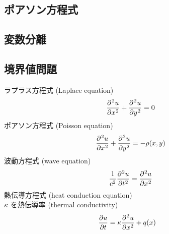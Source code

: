 \documentclass[uplatex,diffipdfmx,a4paper,11pt]{jlreq}
\begin{document}
\subsection{ポアソン方程式}

\subsection{変数分離}

\subsection{境界値問題}
\begin{definition}
  ラプラス方程式 (Laplace equation)
  \begin{align}
    \diffp[2]{u}{x} + \diffp[2]{u}{y} = 0
  \end{align}
  ポアソン方程式 (Poisson equation)
  \begin{align}
    \diffp[2]{u}{x} + \diffp[2]{u}{y} = -\rho(x, y)
  \end{align}
  波動方程式 (wave equation)
  \begin{align}
    \frac{1}{c^2}\diffp[2]{u}{t} = \diffp[2]{u}{x}
  \end{align}
  熱伝導方程式 (heat conduction equation) \\
  $\kappa$ を熱伝導率 (thermal conductivity)
  \begin{align}
    \diffp{u}{t} & = \kappa\diffp[2]{u}{x} + q(x)
  \end{align}
\end{definition}
\end{document}
